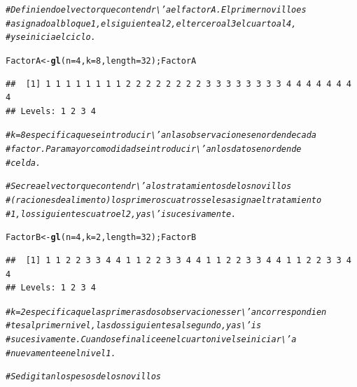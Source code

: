 \documentclass[12pt,letterpaper]{article}\usepackage[]{graphicx}\usepackage[]{color}
\makeatletter
\newcommand{\hlnum}[1]{\textcolor[rgb]{0.686,0.059,0.569}{#1}}%
\newcommand{\hlcom}[1]{\textcolor[rgb]{0.678,0.584,0.686}{\textit{#1}}}%
\newcommand{\hlstd}[1]{\textcolor[rgb]{0.345,0.345,0.345}{#1}}%
\newcommand{\hlkwb}[1]{\textcolor[rgb]{0.69,0.353,0.396}{#1}}%
\newcommand{\hlkwc}[1]{\textcolor[rgb]{0.333,0.667,0.333}{#1}}%
\newcommand{\hlkwd}[1]{\textcolor[rgb]{0.737,0.353,0.396}{\textbf{#1}}}%
\newenvironment{kframe}{%
 \def\at@end@of@kframe{}%
 \ifinner\ifhmode%
  \def\at@end@of@kframe{\end{minipage}}%
  \begin{minipage}{\columnwidth}%
 \fi\fi%
 \def\FrameCommand##1{\hskip\@totalleftmargin \hskip-\fboxsep
 \colorbox{shadecolor}{##1}\hskip-\fboxsep
     \hskip-\linewidth \hskip-\@totalleftmargin \hskip\columnwidth}%
 \MakeFramed {\advance\hsize-\width
   \@totalleftmargin\z@ \linewidth\hsize
   \@setminipage}}%
 {\par\unskip\endMakeFramed%
 \at@end@of@kframe}
\newenvironment{knitrout}{}{} %
\makeatother
\begin{document}
\begin{knitrout}
\color{fgcolor}\begin{kframe}
\begin{alltt}
\hlcom{# Definiendo el vector que contendr\textbackslash{}'a el factor A. El primer novillo es}
\hlcom{# asignado al bloque 1, el siguiente al 2, el tercero al 3 el cuarto al 4,}
\hlcom{# y se inicia el ciclo. }

\hlstd{FactorA} \hlkwb{<-} \hlkwd{gl}\hlstd{(}\hlkwc{n}\hlstd{=}\hlnum{4}\hlstd{,} \hlkwc{k}\hlstd{=}\hlnum{8}\hlstd{,} \hlkwc{length}\hlstd{=}\hlnum{32}\hlstd{);FactorA}
\end{alltt}
\begin{verbatim}
##  [1] 1 1 1 1 1 1 1 1 2 2 2 2 2 2 2 2 3 3 3 3 3 3 3 3 4 4 4 4 4 4 4 4
## Levels: 1 2 3 4
\end{verbatim}
\begin{alltt}
\hlcom{# k=8 especifica que se introducir\textbackslash{}'an las observaciones en orden de cada}
\hlcom{# factor. Para mayor comodidad se introducir\textbackslash{}'an los datos en orden de}
\hlcom{# celda. }

\hlcom{# Se crea el vector que contendr\textbackslash{}'a los tratamientos de los novillos}
\hlcom{# (raciones de alimento) los primeros cuatros se les asigna el tratamiento}
\hlcom{# 1, los siguientes cuatro el 2, y as\textbackslash{}'i sucesivamente.}

\hlstd{FactorB}\hlkwb{<-} \hlkwd{gl}\hlstd{(}\hlkwc{n}\hlstd{=}\hlnum{4}\hlstd{,} \hlkwc{k}\hlstd{=}\hlnum{2}\hlstd{,}\hlkwc{length}\hlstd{=}\hlnum{32}\hlstd{);FactorB}
\end{alltt}
\begin{verbatim}
##  [1] 1 1 2 2 3 3 4 4 1 1 2 2 3 3 4 4 1 1 2 2 3 3 4 4 1 1 2 2 3 3 4 4
## Levels: 1 2 3 4
\end{verbatim}
\begin{alltt}
\hlcom{# k=2 especifica que las primeras dos observaciones ser\textbackslash{}'an correspondien}
\hlcom{# tes al primer nivel, las dos siguientes al segundo, y as\textbackslash{}'is }
\hlcom{# sucesivamente. Cuando se finalice en el cuarto nivel se iniciar\textbackslash{}'a }
\hlcom{# nuevamente en el nivel 1. }

\hlcom{# Se digitan los pesos de los novillos }


\end{alltt}
\end{kframe}
\end{knitrout}
\end{document}
